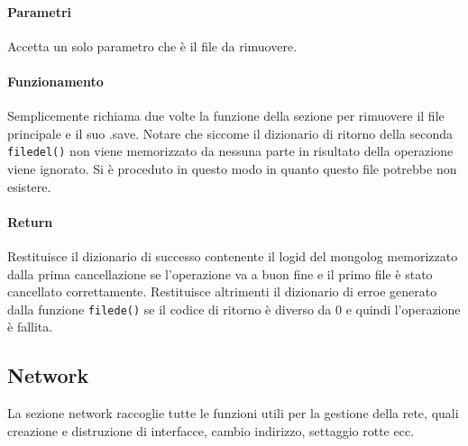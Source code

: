 \documentclass[11pt]{article}
\begin{document}
\paragraph{Parametri}
Accetta un solo parametro che è il file da rimuovere.
\paragraph{Funzionamento}
Semplicemente richiama due volte la funzione  della sezione  per rimuovere il file principale
e il suo .save. Notare che siccome il dizionario di ritorno della seconda \texttt{filedel()} non viene memorizzato da nessuna
parte in risultato della operazione viene ignorato. Si è proceduto in questo modo in quanto questo file potrebbe non esistere.
\paragraph{Return}
Restituisce il dizionario di successo contenente il logid del mongolog memorizzato dalla prima cancellazione
se l'operazione va a buon fine e il primo file è stato cancellato correttamente.
Restituisce altrimenti il dizionario di erroe generato dalla funzione \texttt{filede()} se il codice di ritorno è diverso da 0
e quindi l'operazione è fallita.



\subsection{Network}\label{network}
La sezione network raccoglie tutte le funzioni utili per la gestione della rete, quali creazione e distruzione
di interfacce, cambio indirizzo, settaggio rotte ecc.
\end{document}
